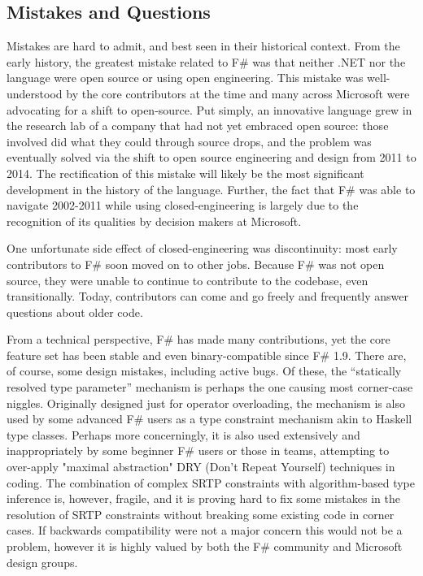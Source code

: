 \documentclass[acmsmall]{acmart}\settopmatter{}
\begin{document}
\subsection*{Mistakes and Questions}

Mistakes are hard to admit, and best seen in their historical context.  From the early history,
the greatest mistake related to F\# was that neither .NET nor the language were open source
or using open engineering.  This mistake was well-understood by the core contributors at the time
and many across Microsoft were advocating for a shift to open-source. Put simply, an innovative language
grew in the research lab of a company that had not yet embraced open source: those involved did
what they could through source drops, and the problem was eventually solved via the shift to open
source engineering and design from 2011 to 2014. The rectification of this mistake will likely be
the most significant development in the history of the language. Further, the fact
that F\# was able to navigate 2002-2011 while using closed-engineering is largely due to the
recognition of its qualities by decision makers at Microsoft.

One unfortunate side effect of closed-engineering was discontinuity: most early
contributors to F\# soon moved on to other jobs. Because F\# was not open source, they
were unable to continue to contribute to the codebase, even transitionally. Today, contributors
can come and go freely and frequently answer questions about older code.

From a technical perspective, F\# has made many contributions, yet the core feature set has
been stable and even binary-compatible since F\# 1.9.  There are, of course, some
design mistakes, including active bugs.  Of these, the “statically resolved type parameter”
mechanism is perhaps the one causing most corner-case niggles. Originally designed just for
operator overloading, the mechanism is also used by some advanced F\# users as a type constraint
mechanism akin to Haskell type classes. Perhaps more concerningly, it is also used extensively
and inappropriately by some beginner F\# users or those in teams, attempting to
over-apply "maximal abstraction" DRY (Don't Repeat Yourself) techniques in coding.   The combination of complex SRTP constraints
with algorithm-based type inference is, however, fragile, and it is proving hard to fix some
mistakes in the resolution of SRTP constraints without breaking some existing code in
corner cases.  If backwards compatibility were not a major concern this would not be
a problem, however it is highly valued by both the F\# community and Microsoft design groups.
\end{document}
